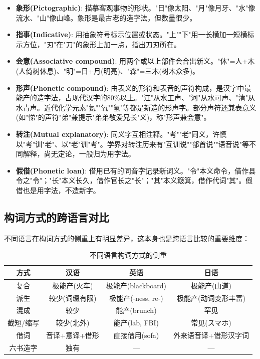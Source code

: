 \begin{itemize}
    \item \textbf{象形(Pictographic)}: 描摹客观事物的形状。"日"像太阳、"月"像月牙、"水"像流水、"山"像山峰。象形是最古老的造字法，但数量很少。
    \item \textbf{指事(Indicative)}: 用抽象符号标示位置或状态。"上""下"用一长横加一短横标示方位，"刃"在"刀"的象形上加一点，指出刀刃所在。
    \item \textbf{会意(Associative compound)}: 用两个或以上部件会合出新义。"休"=人+木(人倚树休息)、"明"=日+月(明亮)、"森"=三木(树木众多)。
    \item \textbf{形声(Phonetic compound)}: 由表义的形符和表音的声符构成，是汉字中最能产的造字法，占现代汉字的80\%以上。"江"从水工声、"河"从水可声、"清"从水青声。近代化学元素"氦""氧""氢"等都是新造的形声字。部分声符还兼表意义(如"悌"的声符"弟"兼提示"弟弟敬爱兄长"义)，称"形声兼会意"。
    \item \textbf{转注(Mutual explanatory)}: 同义字互相注释。"考""老"同义，许慎以"考"训"老"、以"老"训"考"。学界对转注历来有"互训说""部首说""语音说"等不同解释，尚无定论，一般归为用字法。
    \item \textbf{假借(Phonetic loan)}: 借用已有的同音字记录新词义。"令"本义命令，借作县令之"令"；"长"本义长久，借作官长之"长"；"其"本义簸箕，借作代词"其"。假借也是用字法，不造新字。
\end{itemize}

\subsection{构词方式的跨语言对比}

不同语言在构词方式的侧重上有明显差异，这本身也是跨语言比较的重要维度：

\begin{table}[H]
\centering
\caption{不同语言构词方式的侧重}
\begin{tabulary}{\textwidth}{@{}CCCC@{}}
\toprule
\textbf{方式} & \textbf{汉语} & \textbf{英语} & \textbf{日语} \\
\midrule
复合 & 极能产(火车) & 极能产(blackboard) & 极能产(山道) \\
派生 & 较少(词缀有限) & 极能产(-ness, re-) & 极能产(动词变形丰富) \\
混成 & 较少 & 能产(brunch) & 罕见 \\
截短/缩写 & 较少(北外) & 能产(lab, FBI) & 常见(スマホ) \\
借词 & 音译+意译+借形 & 直接借用(sofa) & 外来语音译+借形汉字词 \\
六书造字 & 独有 & — & — \\
\bottomrule
\end{tabulary}
\end{table}

